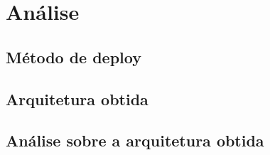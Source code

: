 \chapter{Análise}
\label{cap3}

\section{Método de deploy}

\section{Arquitetura obtida}

\section{Análise sobre a arquitetura obtida}

